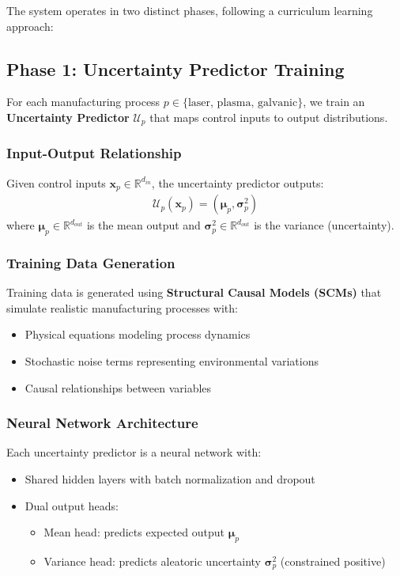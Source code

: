 \documentclass[11pt,a4paper]{article}
\begin{document}
The system operates in two distinct phases, following a curriculum learning approach:

\subsection{Phase 1: Uncertainty Predictor Training}

For each manufacturing process $p \in \{\text{laser, plasma, galvanic}\}$, we train an \textbf{Uncertainty Predictor} $\mathcal{U}_p$ that maps control inputs to output distributions.

\subsubsection{Input-Output Relationship}
Given control inputs $\mathbf{x}_p \in \mathbb{R}^{d_{in}}$, the uncertainty predictor outputs:
\begin{align}
\mathcal{U}_p(\mathbf{x}_p) = (\boldsymbol{\mu}_p, \boldsymbol{\sigma}^2_p)
\end{align}
where $\boldsymbol{\mu}_p \in \mathbb{R}^{d_{out}}$ is the mean output and $\boldsymbol{\sigma}^2_p \in \mathbb{R}^{d_{out}}$ is the variance (uncertainty).

\subsubsection{Training Data Generation}
Training data is generated using \textbf{Structural Causal Models (SCMs)} that simulate realistic manufacturing processes with:
\begin{itemize}
    \item Physical equations modeling process dynamics
    \item Stochastic noise terms representing environmental variations
    \item Causal relationships between variables
\end{itemize}

\subsubsection{Neural Network Architecture}
Each uncertainty predictor is a neural network with:
\begin{itemize}
    \item Shared hidden layers with batch normalization and dropout
    \item Dual output heads:
    \begin{itemize}
        \item Mean head: predicts expected output $\boldsymbol{\mu}_p$
        \item Variance head: predicts aleatoric uncertainty $\boldsymbol{\sigma}^2_p$ (constrained positive)
    \end{itemize}
\end{itemize}
\end{document}
